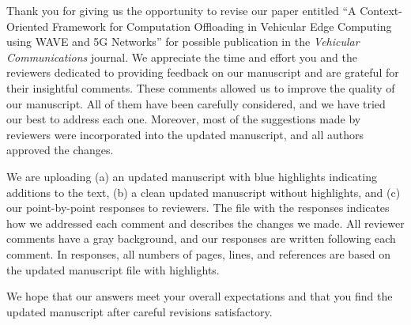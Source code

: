Thank you for giving us the opportunity to revise our paper entitled “A Context-Oriented Framework for Computation Offloading in Vehicular Edge Computing using WAVE and 5G Networks” for possible publication in the \textit{Vehicular Communications} journal. We appreciate the time and effort you and the reviewers dedicated to providing feedback on our manuscript and are grateful for their insightful comments. These comments allowed us to improve the quality of our manuscript. All of them have been carefully considered, and we have tried our best to address each one. Moreover, most of the suggestions made by reviewers were incorporated into the updated manuscript, and all authors approved the changes.

We are uploading (a) an updated manuscript with blue highlights indicating additions to the text, (b) a clean updated manuscript without highlights, and (c) our point-by-point responses to reviewers. The file with the responses indicates how we addressed each comment and describes the changes we made. All reviewer comments have a gray background, and our responses are written following each comment. In responses, all numbers of pages, lines, and references are based on the updated manuscript file with highlights.

We hope that our answers meet your overall expectations and that you find the updated manuscript after careful revisions satisfactory.